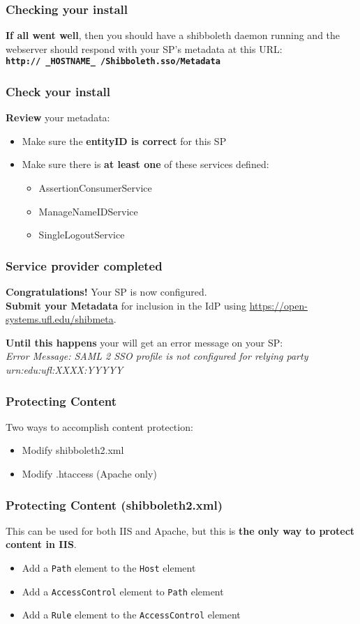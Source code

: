 \documentclass[hyperref={colorlinks=true},professionalfonts]{beamer}
\newcommand{\us}[1]{ \_#1\_ } %
\begin{document}
\begin{frame}
\frametitle{Checking your install}
\textbf{If all went well}, then you should have a shibboleth daemon running 
and the webserver should respond with your SP's metadata at this URL: \\ \bigskip
\textbf{\texttt{http://\us{HOSTNAME}/Shibboleth.sso/Metadata}}
\end{frame}

\begin{frame}
\frametitle{Check your install}
\textbf{Review} your metadata:
\begin{itemize}
\item Make sure the \textbf{entityID is correct} for this SP
\item Make sure there is \textbf{at least one} of these services defined:
\begin{itemize}
\item AssertionConsumerService
\item ManageNameIDService
\item SingleLogoutService
\end{itemize}
\end{itemize}
\end{frame}

\begin{frame}
\frametitle{Service provider completed}
{\large \textbf{Congratulations!} Your SP is now configured.} \\
\bigskip
\textbf{Submit your Metadata} for inclusion in the IdP using \url{https://open-systems.ufl.edu/shibmeta}.

\bigskip \bigskip
\textbf{Until this happens} your will get an error message on your SP: \\ \bigskip
\textit{Error Message: SAML 2 SSO profile is not configured for relying party urn:edu:ufl:XXXX:YYYYY}
\end{frame}

\begin{frame}
\frametitle{Protecting Content}
Two ways to accomplish content protection:
\begin{itemize}
\item Modify shibboleth2.xml
\item Modify .htaccess (Apache only)
\end{itemize}
\end{frame}

\begin{frame}
\frametitle{Protecting Content (shibboleth2.xml)}
This can be used for both IIS and Apache, but this is \textbf{the only way to protect content in IIS}.
\begin{itemize}
\item Add a \texttt{Path} element to the \texttt{Host} element 
\item Add a \texttt{AccessControl} element to \texttt{Path} element
\item Add a \texttt{Rule} element to the \texttt{AccessControl} element
\end{itemize}
\end{frame}
\end{document}
